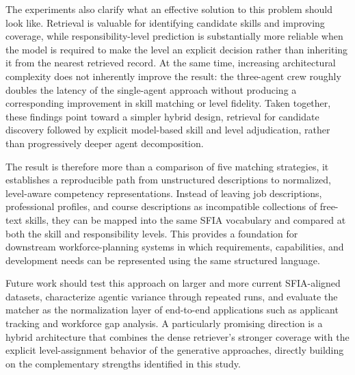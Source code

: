 \documentclass[conference]{IEEEtran}
\begin{document}
The experiments also clarify what an effective solution to this problem should look like. Retrieval is valuable for identifying candidate skills and improving coverage, while responsibility-level prediction is substantially more reliable when the model is required to make the level an explicit decision rather than inheriting it from the nearest retrieved record. At the same time, increasing architectural complexity does not inherently improve the result: the three-agent crew roughly doubles the latency of the single-agent approach without producing a corresponding improvement in skill matching or level fidelity. Taken together, these findings point toward a simpler hybrid design, retrieval for candidate discovery followed by explicit model-based skill and level adjudication, rather than progressively deeper agent decomposition.

The result is therefore more than a comparison of five matching strategies, it establishes a reproducible path from unstructured descriptions to normalized, level-aware competency representations. Instead of leaving job descriptions, professional profiles, and course descriptions as incompatible collections of free-text skills, they can be mapped into the same SFIA vocabulary and compared at both the skill and responsibility levels. This provides a foundation for downstream workforce-planning systems in which requirements, capabilities, and development needs can be represented using the same structured language.

Future work should test this approach on larger and more current SFIA-aligned datasets, characterize agentic variance through repeated runs, and evaluate the matcher as the normalization layer of end-to-end applications such as applicant tracking and workforce gap analysis. A particularly promising direction is a hybrid architecture that combines the dense retriever's stronger coverage with the explicit level-assignment behavior of the generative approaches, directly building on the complementary strengths identified in this study.


{\footnotesize
}
\end{document}
